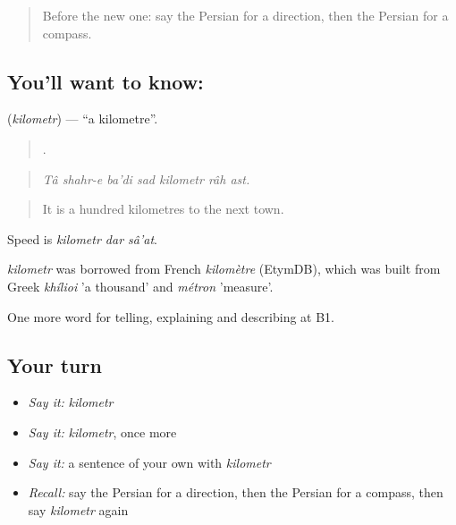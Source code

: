 \label{lesson:FA-C446-kilometr}



\begin{quote}
Before the new one: say the Persian for a direction, then the Persian for a compass.
\end{quote}

\subsection*{You'll want to know: }
\textbf{} (\emph{kilometr}) — \textquotedblleft{}a kilometre\textquotedblright{}.

\begin{quote}
      .
\end{quote}

\begin{quote}
\emph{Tâ shahr-e ba'di sad kilometr râh ast.}
\end{quote}

\begin{quote}
It is a hundred kilometres to the next town.
\end{quote}

Speed is \emph{kilometr dar sâ'at}.

\begin{cousinweb}
\emph{kilometr} was borrowed from French \emph{kilomètre} (EtymDB), which was built from Greek \emph{khílioi} 'a thousand' and \emph{métron} 'measure'.
\end{cousinweb}

\begin{grammarlens}[title={What you've built}]
One more word for telling, explaining and describing at B1.
\end{grammarlens}

\subsection*{Your turn}
\begin{itemize}
\raggedright
  \item \emph{Say it:} \emph{kilometr}
  \item \emph{Say it:} \emph{kilometr}, once more
  \item \emph{Say it:} a sentence of your own with \emph{kilometr}
  \item \emph{Recall:} say the Persian for a direction, then the Persian for a compass, then say \emph{kilometr} again
\end{itemize}

